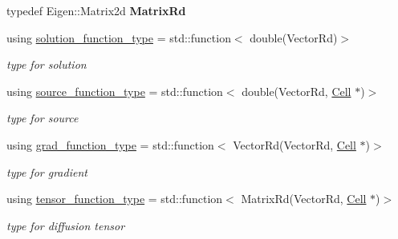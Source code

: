 \begin{DoxyCompactItemize}
\item 
\mbox{\label{classHArDCore2D_1_1HHO__Diffusion_adaca69eb166fb45f4ee92d555f7181d5}} 
typedef Eigen\+::\+Matrix2d {\bfseries Matrix\+Rd}
\item 
\mbox{\label{classHArDCore2D_1_1HHO__Diffusion_ad64a9a3249e7345e7dbaafb7b578f524}} 
using \hyperlink{classHArDCore2D_1_1HHO__Diffusion_ad64a9a3249e7345e7dbaafb7b578f524}{solution\+\_\+function\+\_\+type} = std\+::function$<$ double(Vector\+Rd)$>$
\begin{DoxyCompactList}\small\item\em type for solution \end{DoxyCompactList}\item 
\mbox{\label{classHArDCore2D_1_1HHO__Diffusion_afc8040de1122421f070bb19231db5431}} 
using \hyperlink{classHArDCore2D_1_1HHO__Diffusion_afc8040de1122421f070bb19231db5431}{source\+\_\+function\+\_\+type} = std\+::function$<$ double(Vector\+Rd, \hyperlink{classHArDCore2D_1_1Cell}{Cell} $\ast$)$>$
\begin{DoxyCompactList}\small\item\em type for source \end{DoxyCompactList}\item 
\mbox{\label{classHArDCore2D_1_1HHO__Diffusion_a9f9412bc2a0a28033591d2e8a5750d90}} 
using \hyperlink{classHArDCore2D_1_1HHO__Diffusion_a9f9412bc2a0a28033591d2e8a5750d90}{grad\+\_\+function\+\_\+type} = std\+::function$<$ Vector\+Rd(Vector\+Rd, \hyperlink{classHArDCore2D_1_1Cell}{Cell} $\ast$)$>$
\begin{DoxyCompactList}\small\item\em type for gradient \end{DoxyCompactList}\item 
\mbox{\label{classHArDCore2D_1_1HHO__Diffusion_a5c4f7bf42c46d5bd8fde47396c2a9de5}} 
using \hyperlink{classHArDCore2D_1_1HHO__Diffusion_a5c4f7bf42c46d5bd8fde47396c2a9de5}{tensor\+\_\+function\+\_\+type} = std\+::function$<$ Matrix\+Rd(Vector\+Rd, \hyperlink{classHArDCore2D_1_1Cell}{Cell} $\ast$)$>$
\begin{DoxyCompactList}\small\item\em type for diffusion tensor \end{DoxyCompactList}\end{DoxyCompactItemize}
